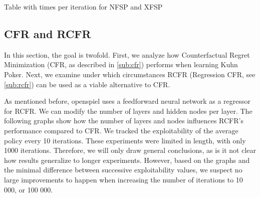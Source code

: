 \documentclass[10pt,a4paper]{article}
\begin{document}
\begin{tcolorbox}
	Table with times per iteration for NFSP and XFSP
\end{tcolorbox}

\subsection{CFR and RCFR}
In this section, the goal is twofold. First, we analyze how Counterfactual Regret Minimization (CFR, as described in \ref{sub:cfr}) performs when learning Kuhn Poker. Next, we examine under which circumstances RCFR (Regression CFR, see \ref{sub:rcfr}) can be used as a viable alternative to CFR.

As mentioned before, openspiel uses a feedforward neural network as a regressor for RCFR. We can modify the number of layers and hidden nodes per layer. The following graphs show how the number of layers and nodes influences RCFR's performance compared to CFR. We tracked the exploitability of the average policy every 10 iterations. These experiments were limited in length, with only 1000 iterations. Therefore, we will only draw general conclusions, as is it not clear how results generalize to longer experiments. However, based on the graphs and the minimal difference between successive exploitability values, we suspect no large improvements to happen when increasing the number of iterations to 10 000, or 100 000.
 
\end{document}
